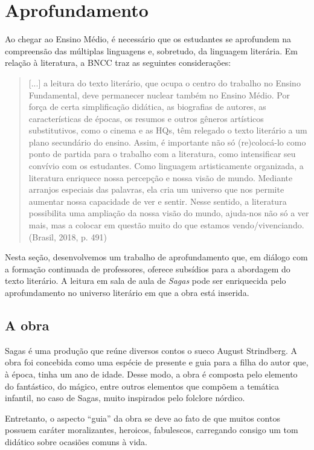 \documentclass{extarticle}
\begin{document}
\section{Aprofundamento}

Ao chegar ao Ensino Médio, é necessário que os estudantes se aprofundem
na compreensão das múltiplas linguagens e, sobretudo, da linguagem
literária. Em relação à literatura, a BNCC traz as seguintes
considerações:

\begin{quote}
{[}...{]} a leitura do texto literário, que ocupa o centro do trabalho
no Ensino Fundamental, deve permanecer nuclear também no Ensino Médio.
Por força de certa simplificação didática, as biografias de autores, as
características de épocas, os resumos e outros gêneros artísticos
substitutivos, como o cinema e as HQs, têm relegado o texto literário a
um plano secundário do ensino. Assim, é importante não só (re)colocá-lo
como ponto de partida para o trabalho com a literatura, como
intensificar seu convívio com os estudantes. Como linguagem
artisticamente organizada, a literatura enriquece nossa percepção e
nossa visão de mundo. Mediante arranjos especiais das palavras, ela cria
um universo que nos permite aumentar nossa capacidade de ver e sentir.
Nesse sentido, a literatura possibilita uma ampliação da nossa visão do
mundo, ajuda-nos não só a ver mais, mas a colocar em questão muito do
que estamos vendo/vivenciando. (Brasil, 2018, p. 491)
\end{quote}

Nesta seção, desenvolvemos um trabalho de aprofundamento que, em diálogo
com a formação continuada de professores, oferece subsídios para a
abordagem do texto literário. A leitura em sala de aula de \emph{Sagas}
pode ser enriquecida pelo aprofundamento no universo literário em que a
obra está inserida.

\subsection{A obra}

Sagas é uma produção que reúne diversos contos o sueco August
Strindberg. A obra foi concebida como uma espécie de presente e guia
para a filha do autor que, à época, tinha um ano de idade. Desse modo, a
obra é composta pelo elemento do fantástico, do mágico, entre outros
elementos que compõem a temática infantil, no caso de Sagas, muito
inspirados pelo folclore nórdico.

Entretanto, o aspecto ``guia'' da obra se deve ao fato de que muitos
contos possuem caráter moralizantes, heroicos, fabulescos, carregando
consigo um tom didático sobre ocasiões comuns à vida.
\end{document}
